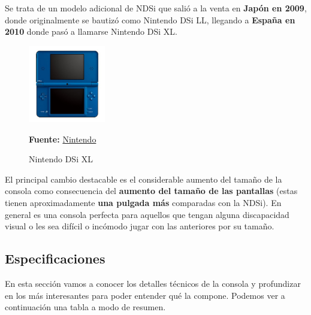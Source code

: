 Se trata de un modelo adicional de NDSi que salió a la venta en \textbf{Japón en 2009}, donde originalmente se bautizó como Nintendo DSi LL, llegando a \textbf{España en 2010} donde pasó a llamarse Nintendo DSi XL.

\vspace{0.5cm}

\begin{figure}[htbp]
\centering
  \includegraphics[width=0.3\textwidth]{archivos/ndsixl.jpg}
  \caption{Nintendo DSi XL}
    \textbf{Fuente:} \href{https://www.nintendo.co.uk/Nintendo-DS/Nintendo-DS-Family-Nintendo-UK-s-official-site-Nintendo-DS-Nintendo-DSi-Nintendo-DSi-XL-116380.html}{Nintendo}
  \label{fig:ndsixl} %
\end{figure}

\vspace{0.5cm}

El principal cambio destacable es el considerable aumento del tamaño de la consola como consecuencia del \textbf{aumento del tamaño de las pantallas} (estas tienen aproximadamente \textbf{una pulgada más} comparadas con la NDSi). En general es una consola perfecta para aquellos que tengan alguna discapacidad visual o les sea difícil o incómodo jugar con las anteriores por su tamaño.

\vspace{1cm}

\subsection{Especificaciones}

En esta sección vamos a conocer los detalles técnicos de la consola y profundizar en los más interesantes para poder entender qué la compone. Podemos ver a continuación una tabla a modo de resumen.
\clearpage

